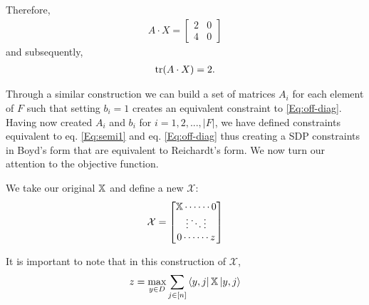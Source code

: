 Therefore,
\begin{align}
    A \cdot X = \left[ \begin{matrix} 2 & 0 \\ 4 & 0 \end{matrix} \right] \nonumber
\end{align}
and subsequently,
\begin{align}
    \operatorname{\text{tr}}(A \cdot X) = 2. \nonumber
\end{align}

Through a similar construction we can build a set of matrices 
$A_i$ for each element of $F$ such that setting $b_i = 1$ 
creates an equivalent constraint to \cref{Eq:off-diag}.
Having now created $A_i$ and $b_i$ for $i = 1,2,...,
|F|$, we have defined constraints equivalent to eq.
\ref{Eq:semi1} and eq. \ref{Eq:off-diag} thus creating
a SDP constraints in Boyd's form that are equivalent to
Reichardt's form.
We now turn our attention to the objective function.

We take our original $\operatorname{\mathbb{X}}$ and define a new
$\mathcal{X}$:
\begin{equation}
    \mathcal{X} = \left[\begin{matrix} \operatorname{\mathbb{X}} \cdots \cdots 0 \\
                                \vdots \ddots \vdots \\
                                0 \cdots \cdots z  \end{matrix}
                                \right]  
\end{equation}

It is important to note that in this construction of $\mathcal{X}$,
\begin{equation}
    z = \max_{y \in D} \sum_{j \in [n]}
    \bra{y,j}\operatorname{\mathbb{X}}\ket{y,j} 
\end{equation}

